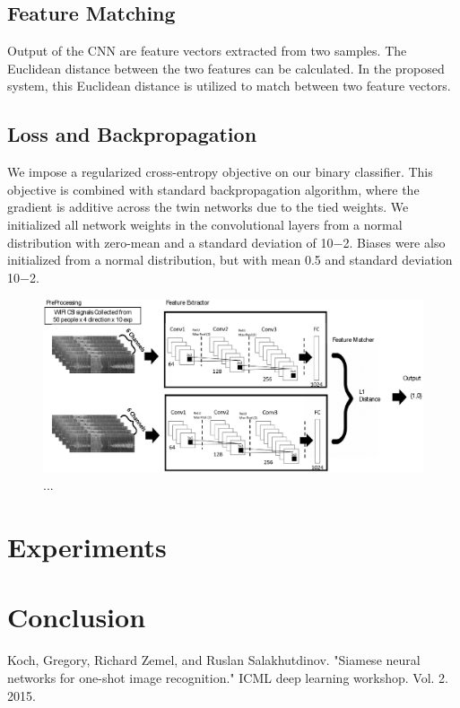 \documentclass[runningheads]{llncs}
\begin{document}
\subsection{Feature Matching}
Output of the CNN are feature vectors extracted from two samples. The Euclidean distance between the two features can be calculated.
In the proposed system, this Euclidean distance is utilized to match between two feature vectors.

\subsection{Loss and Backpropagation}
 We impose a regularized cross-entropy objective on our binary classifier.
This objective is combined with standard backpropagation algorithm, where the gradient is additive across the twin networks due to the tied weights.
 We initialized all network weights in the convolutional layers from a normal distribution with zero-mean and a standard deviation of 10−2. Biases were also initialized from a normal distribution, but with mean 0.5 and standard deviation 10−2.
\begin{figure}
\includegraphics[width=\textwidth]{network1.eps}
\caption{...} \label{network1}
\end{figure}

\section{Experiments}
\section{Conclusion}

%
%
%
% 
% 
%
\begin{thebibliography}{8}
Koch, Gregory, Richard Zemel, and Ruslan Salakhutdinov.
 "Siamese neural networks for one-shot image recognition." 
 ICML deep learning workshop. Vol. 2. 2015.


\end{thebibliography}
\end{document}
